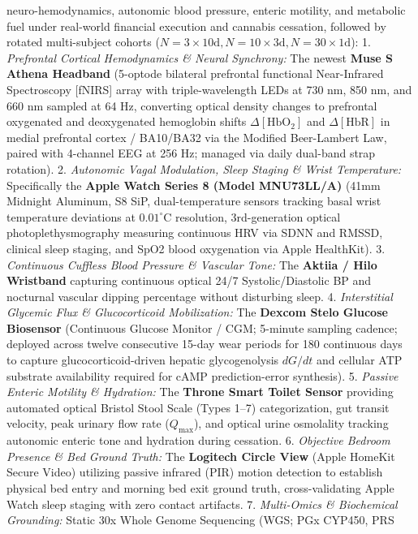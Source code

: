 \documentclass[
]{article}
\begin{document}
neuro-hemodynamics, autonomic blood pressure, enteric motility, and
metabolic fuel under real-world financial execution and cannabis
cessation, followed by rotated multi-subject cohorts
(\(N=3\times 10\text{d}, N=10\times 3\text{d}, N=30\times 1\text{d}\)):
1. \emph{Prefrontal Cortical Hemodynamics \& Neural Synchrony:} The
newest \textbf{Muse S Athena Headband} (5-optode bilateral prefrontal
functional Near-Infrared Spectroscopy {[}fNIRS{]} array with
triple-wavelength LEDs at 730 nm, 850 nm, and 660 nm sampled at 64 Hz,
converting optical density changes to prefrontal oxygenated and
deoxygenated hemoglobin shifts \(\Delta [\mathrm{HbO}_2]\) and
\(\Delta [\mathrm{HbR}]\) in medial prefrontal cortex / BA10/BA32 via
the Modified Beer-Lambert Law, paired with 4-channel EEG at 256 Hz;
managed via daily dual-band strap rotation). 2. \emph{Autonomic Vagal
Modulation, Sleep Staging \& Wrist Temperature:} Specifically the
\textbf{Apple Watch Series 8 (Model MNU73LL/A)} (41mm Midnight Aluminum,
S8 SiP, dual-temperature sensors tracking basal wrist temperature
deviations at \(0.01^\circ\mathrm{C}\) resolution, 3rd-generation
optical photoplethysmography measuring continuous HRV via SDNN and
RMSSD, clinical sleep staging, and SpO2 blood oxygenation via Apple
HealthKit). 3. \emph{Continuous Cuffless Blood Pressure \& Vascular
Tone:} The \textbf{Aktiia / Hilo Wristband} capturing continuous optical
24/7 Systolic/Diastolic BP and nocturnal vascular dipping percentage
without disturbing sleep. 4. \emph{Interstitial Glycemic Flux \&
Glucocorticoid Mobilization:} The \textbf{Dexcom Stelo Glucose
Biosensor} (Continuous Glucose Monitor / CGM; 5-minute sampling cadence;
deployed across twelve consecutive 15-day wear periods for 180
continuous days to capture glucocorticoid-driven hepatic glycogenolysis
\(dG/dt\) and cellular ATP substrate availability required for cAMP
prediction-error synthesis). 5. \emph{Passive Enteric Motility \&
Hydration:} The \textbf{Throne Smart Toilet Sensor} providing automated
optical Bristol Stool Scale (Types 1--7) categorization, gut transit
velocity, peak urinary flow rate (\(Q_{\text{max}}\)), and optical urine
osmolality tracking autonomic enteric tone and hydration during
cessation. 6. \emph{Objective Bedroom Presence \& Bed Ground Truth:} The
\textbf{Logitech Circle View} (Apple HomeKit Secure Video) utilizing
passive infrared (PIR) motion detection to establish physical bed entry
and morning bed exit ground truth, cross-validating Apple Watch sleep
staging with zero contact artifacts. 7. \emph{Multi-Omics \& Biochemical
Grounding:} Static 30x Whole Genome Sequencing (WGS; PGx CYP450, PRS
\end{document}
